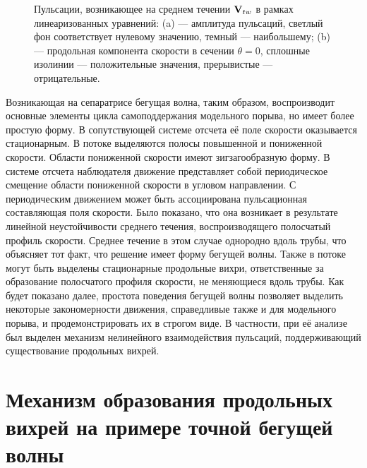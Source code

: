 \begin{figure}
\caption{Пульсации, возникающее на среднем течении $\mathbf{V}_{tw}$ в рамках линеаризованных уравнений: (a) --- амплитуда пульсаций, светлый фон соответствует нулевому значению, темный --- наибольшему; (b) --- продольная компонента скорости в сечении $\theta = 0$, сплошные изолинии --- положительные значения, прерывистые --- отрицательные. }
\label{pipetw_lin_pic}
\end{figure}



Возникающая на сепаратрисе бегущая волна, таким образом, воспроизводит основные элементы цикла самоподдержания модельного порыва, но имеет более простую форму. В сопутствующей системе отсчета её поле скорости оказывается стационарным. В потоке выделяются полосы повышенной и пониженной скорости. Области пониженной скорости имеют зигзагообразную форму. В системе отсчета наблюдателя движение представляет собой периодическое смещение области пониженной скорости в угловом направлении. С периодическим движением может быть ассоциирована пульсационная составляющая поля скорости. Было показано, что она возникает в результате линейной неустойчивости среднего течения, воспроизводящего полосчатый профиль скорости. Среднее течение в этом случае однородно вдоль трубы, что объясняет тот факт, что решение имеет форму бегущей волны. Также в потоке могут быть выделены стационарные продольные вихри, ответственные за образование полосчатого профиля скорости, не меняющиеся вдоль трубы. Как будет показано далее, простота поведения бегущей волны позволяет выделить некоторые закономерности движения, справедливые также и для модельного порыва, и продемонстрировать их в строгом виде. В частности, при её анализе был выделен механизм нелинейного взаимодействия пульсаций, поддерживающий существование продольных вихрей. 


\section{Механизм образования продольных вихрей на примере точной бегущей волны}

